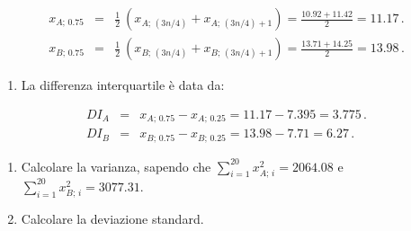 \documentclass[
  11pt,
]{book}
\providecommand{\tightlist}{%
  \setlength{\itemsep}{0pt}\setlength{\parskip}{0pt}}
\theoremstyle{mytheoremstyle}
\theoremstyle{mydefstyle}
\newenvironment{sol}
  {
  \begin{tcolorbox}[enhanced,breakable,arc=0.1mm,boxrule=1pt,colback=white,colframe=iblue,
  title=\bf \fontfamily{lmss}\selectfont \hspace{.5 cm} Soluzione,drop fuzzy shadow]

}{
\end{tcolorbox}
  }
\begin{document}
\begin{sol}
\begin{eqnarray*}
x_{A;\, 0.75} &=& \frac{1} {2}\ \left( x_{A;\, (3n/4)} + x_{A;\, (3n/4)+1} \right)
               =  \frac{10.92 + 11.42} {2} = 11.17 \,. \\
x_{B;\, 0.75} &=& \frac{1} {2}\ \left( x_{B;\, (3n/4)} + x_{B;\, (3n/4)+1} \right)
               =  \frac{13.71 + 14.25} {2} = 13.98 \,.
\end{eqnarray*}

\begin{enumerate}
\def\labelenumi{\alph{enumi}.}
\setcounter{enumi}{5}
\tightlist
\item
  La differenza interquartile è data da:
\end{enumerate}

\begin{eqnarray*}
DI_{A} &=& x_{A;\, 0.75} - x_{A;\, 0.25} = 11.17 - 7.395 = 3.775 \,. \\
DI_{B} &=& x_{B;\, 0.75} - x_{B;\, 0.25} = 13.98 - 7.71  = 6.27 \,.
\end{eqnarray*}

\end{sol}

\begin{enumerate}
\def\labelenumi{\alph{enumi}.}
\setcounter{enumi}{6}
\tightlist
\item
  Calcolare la varianza, sapendo che
  \(\sum_{i=1}^{20} x_{A;\, i}^{2} = 2064.08\) e
  \(\sum_{i=1}^{20} x_{B;\, i}^{2} = 3077.31\).
\item
  Calcolare la deviazione standard.
\end{enumerate}
\end{document}
